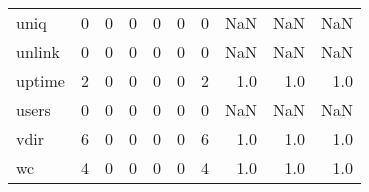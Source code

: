\begin{longtable}{lrrrrrrrrr}
uniq      &                                       0 &                                                  0 &                                                  0 &                                                  0 &                                                  0 &                                                  0 &                                                NaN &                                    NaN &                                  NaN \\
unlink    &                                       0 &                                                  0 &                                                  0 &                                                  0 &                                                  0 &                                                  0 &                                                NaN &                                    NaN &                                  NaN \\
uptime    &                                       2 &                                                  0 &                                                  0 &                                                  0 &                                                  0 &                                                  2 &                                                1.0 &                                    1.0 &                                  1.0 \\
users     &                                       0 &                                                  0 &                                                  0 &                                                  0 &                                                  0 &                                                  0 &                                                NaN &                                    NaN &                                  NaN \\
vdir      &                                       6 &                                                  0 &                                                  0 &                                                  0 &                                                  0 &                                                  6 &                                                1.0 &                                    1.0 &                                  1.0 \\
wc        &                                       4 &                                                  0 &                                                  0 &                                                  0 &                                                  0 &                                                  4 &                                                1.0 &                                    1.0 &                                  1.0 \\

\end{longtable}
